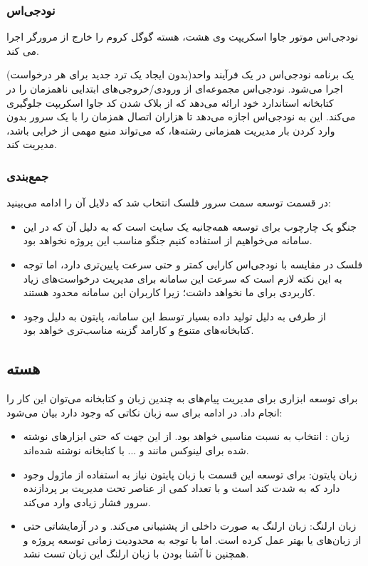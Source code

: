 \subsubsection{نودجی‌اس}
نودجی‌اس موتور جاوا اسکریپت وی هشت، هسته گوگل کروم را خارج از مرورگر اجرا می کند.

یک برنامه نودجی‌اس در یک فرآیند واحد(بدون ایجاد یک ترد جدید برای هر درخواست) اجرا می‌شود. نودجی‌اس مجموعه‌ای از ورودی/خروجی‌های ابتدایی ناهمزمان را در کتابخانه استاندارد خود ارائه می‌دهد که از بلاک شدن کد جاوا اسکریپت جلوگیری می‌کند. این به نودجی‌اس اجازه می‌دهد تا هزاران اتصال همزمان را با یک سرور بدون وارد کردن بار مدیریت همزمانی رشته‌ها، که می‌تواند منبع مهمی از خرابی باشد، مدیریت کند.

\subsubsection{جمع‌بندی}
در قسمت توسعه سمت سرور فلسک انتخاب شد که دلایل آن را ادامه می‌بینید:
\begin{itemize}
    \item جنگو یک چارچوب برای توسعه همه‌جانبه یک سایت است که به دلیل آن که در این سامانه می‌خواهیم از  استفاده کنیم جنگو مناسب این پروژه نخواهد بود.
    \item فلسک در مقایسه با نودجی‌اس کارایی کمتر و حتی سرعت پایین‌تری دارد، اما توجه به این نکته لازم است که سرعت این سامانه برای مدیریت درخواست‌های زیاد کاربردی برای ما نخواهد داشت؛ زیرا کاربران این سامانه محدود هستند.
    \item از طرفی به دلیل تولید داده بسیار توسط این سامانه، پایتون به دلیل وجود کتابخانه‌های متنوع و کارامد گزینه مناسب‌تری خواهد بود. 
\end{itemize}


\subsection{هسته }
برای توسعه ابزاری برای مدیریت پیام‌های  به چندین زبان و کتابخانه می‌توان این کار را انجام داد. در ادامه برای سه زبان نکاتی که وجود دارد بیان می‌شود:

\begin{itemize}
    \item زبان : انتخاب به نسبت مناسبی خواهد بود. از این جهت که حتی ابزارهای نوشته شده برای لینوکس مانند  و ... با کتابخانه  نوشته شده‌اند.
    \item زبان پایتون: برای توسعه این قسمت با زبان پایتون نیاز به استفاده از ماژول  وجود دارد که به شدت کند است و با تعداد کمی از عناصر تحت مدیریت بر پردازنده سرور فشار زیادی وارد می‌کند.
    \item زبان ارلنگ: زبان ارلنگ به صورت داخلی از  پشتیبانی می‌کند. و در آزمایشاتی حتی از زبان‌های  یا  بهتر عمل کرده است. اما با توجه به محدودیت زمانی توسعه پروژه و همچنین نا آشنا بودن با زبان ارلنگ این زبان تست نشد.
\end{itemize}

